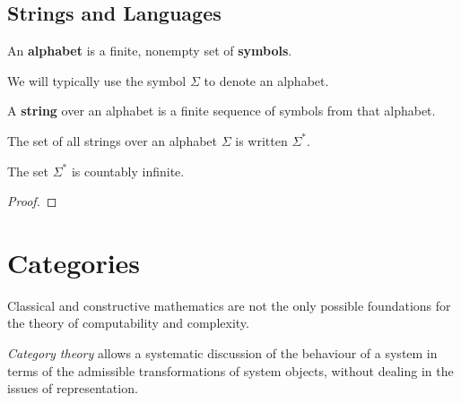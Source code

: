 




\subsection{Strings and Languages}

\begin{definition} An \textbf{alphabet} is a finite, nonempty set of
\textbf{symbols}. \end{definition}

\begin{notation} We will typically use the symbol $\Sigma$ to denote an
alphabet. \end{notation}

\begin{definition} A \textbf{string} over an alphabet is a finite sequence of
symbols from that alphabet. \end{definition}

\begin{definition} The set of all strings over an alphabet $\Sigma$ is written
$\Sigma^*$. \end{definition}

\begin{theorem} \label{thm:kleene-star-countably-infinite} The set $\Sigma^*$
is countably infinite. \end{theorem}

\begin{proof} \end{proof}

\section{Categories}

Classical and constructive mathematics are not the only possible foundations
for the theory of computability and complexity.

\emph{Category theory} allows a systematic discussion of the behaviour of a
system in terms of the admissible transformations of system objects, without
dealing in the issues of representation.

